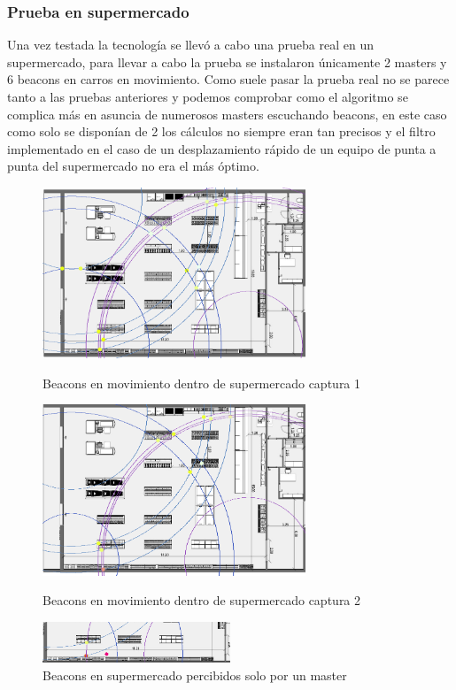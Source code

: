 \documentclass[a4paper ,12pt, onecolumn]{article}
\begin{document}
        \subsubsection{Prueba en supermercado}
            Una vez testada la tecnología se llevó a cabo una prueba real en un supermercado, para llevar a cabo la prueba
            se instalaron únicamente 2 masters y 6 beacons en carros en movimiento.
            Como suele pasar la prueba real no se parece tanto a las pruebas anteriores y podemos comprobar como 
            el algoritmo se complica más en asuncia de numerosos masters escuchando beacons, en este caso como solo se disponían
            de 2 los cálculos no siempre eran tan precisos y el filtro implementado en el caso de un desplazamiento rápido de un 
            equipo de punta a punta del supermercado no era el más óptimo.
            \begin{center}
                \begin{figure}[]
                    \centering
                    \includegraphics[width=0.7\textwidth]{../../Memmory/images/agrupation_3.PNG}
                    \caption{Beacons en movimiento dentro de supermercado captura 1}
                    \includegraphics[width=0.7\textwidth]{../../Memmory/images/agrupation_2.PNG}
                    \caption{Beacons en movimiento dentro de supermercado captura 2}
                    \includegraphics[width=0.5\textwidth]{../../Memmory/images/agrupation_1.PNG}
                    \caption{Beacons en supermercado percibidos solo por un master}
                    \label{fig:mesh11}
                \end{figure}
            \end{center}   
            
\end{document}
